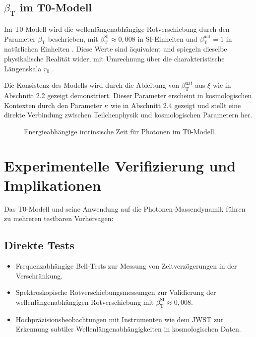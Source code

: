 \documentclass[12pt,a4paper]{article}
\newcommand{\betaT}{\beta_{\text{T}}}
\begin{document}
	\subsection{\(\betaT\) im T0-Modell}
	Im T0-Modell wird die wellenlängenabhängige Rotverschiebung durch den Parameter \(\betaT\) beschrieben, mit \(\betaT^{\text{SI}} \approx 0,008\) in SI-Einheiten und \(\betaT^{\text{nat}} = 1\) in natürlichen Einheiten \cite{pascher_params_2025}. Diese Werte sind äquivalent und spiegeln dieselbe physikalische Realität wider, mit Umrechnung über die charakteristische Längenskala \(r_0\) \cite{pascher_temp_2025}.
	
	Die Konsistenz des Modells wird durch die Ableitung von \(\betaT^{\text{nat}}\) aus \(\xi\) wie in Abschnitt 2.2 gezeigt demonstriert. Dieser Parameter erscheint in kosmologischen Kontexten durch den Parameter \(\kappa\) wie in Abschnitt 2.4 gezeigt und stellt eine direkte Verbindung zwischen Teilchenphysik und kosmologischen Parametern her.
	
	\begin{figure}[h]
		\centering
		\caption{Energieabhängige intrinsische Zeit für Photonen im T0-Modell.}
	\end{figure}
	
	\section{Experimentelle Verifizierung und Implikationen}
	
	Das T0-Modell und seine Anwendung auf die Photonen-Massendynamik führen zu mehreren testbaren Vorhersagen:
	
	\subsection{Direkte Tests}
	\begin{itemize}
		\item Frequenzabhängige Bell-Tests zur Messung von Zeitverzögerungen in der Verschränkung.
		\item Spektroskopische Rotverschiebungsmessungen zur Validierung der wellenlängenabhängigen Rotverschiebung mit \(\betaT^{\text{SI}} \approx 0,008\).
		\item Hochpräzisionsbeobachtungen mit Instrumenten wie dem JWST zur Erkennung subtiler Wellenlängenabhängigkeiten in kosmologischen Daten.
	\end{itemize}
	
\end{document}
